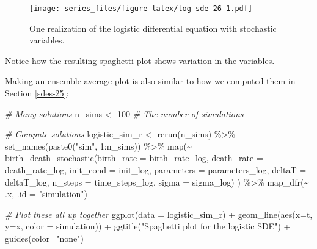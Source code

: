\documentclass[
]{book}
\newenvironment{Shaded}{\begin{snugshade}}{\end{snugshade}}
\newcommand{\AttributeTok}[1]{\textcolor[rgb]{0.77,0.63,0.00}{#1}}
\newcommand{\CommentTok}[1]{\textcolor[rgb]{0.56,0.35,0.01}{\textit{#1}}}
\newcommand{\DecValTok}[1]{\textcolor[rgb]{0.00,0.00,0.81}{#1}}
\newcommand{\FunctionTok}[1]{\textcolor[rgb]{0.00,0.00,0.00}{#1}}
\newcommand{\NormalTok}[1]{#1}
\newcommand{\OtherTok}[1]{\textcolor[rgb]{0.56,0.35,0.01}{#1}}
\newcommand{\SpecialCharTok}[1]{\textcolor[rgb]{0.00,0.00,0.00}{#1}}
\newcommand{\StringTok}[1]{\textcolor[rgb]{0.31,0.60,0.02}{#1}}
\theoremstyle{definition}
\theoremstyle{definition}
\theoremstyle{definition}
\theoremstyle{remark}
\begin{document}
\begin{figure}
\centering
\texttt{[image: series\_files/figure-latex/log-sde-26-1.pdf]}
\caption{\label{fig:log-sde-26}One realization of the logistic differential equation with stochastic variables.}
\end{figure}

Notice how the resulting spaghetti plot shows variation in the variables.

Making an ensemble average plot is also similar to how we computed them in Section \ref{sdes-25}:

\begin{Shaded}
\begin{Highlighting}[]
\CommentTok{\# Many solutions}
\NormalTok{n\_sims }\OtherTok{\textless{}{-}} \DecValTok{100}  \CommentTok{\# The number of simulations}

\CommentTok{\# Compute solutions}
\NormalTok{logistic\_sim\_r }\OtherTok{\textless{}{-}} \FunctionTok{rerun}\NormalTok{(n\_sims) }\SpecialCharTok{\%\textgreater{}\%}
  \FunctionTok{set\_names}\NormalTok{(}\FunctionTok{paste0}\NormalTok{(}\StringTok{"sim"}\NormalTok{, }\DecValTok{1}\SpecialCharTok{:}\NormalTok{n\_sims)) }\SpecialCharTok{\%\textgreater{}\%}
  \FunctionTok{map}\NormalTok{(}\SpecialCharTok{\textasciitilde{}} \FunctionTok{birth\_death\_stochastic}\NormalTok{(}\AttributeTok{birth\_rate =}\NormalTok{ birth\_rate\_log,}
                             \AttributeTok{death\_rate =}\NormalTok{ death\_rate\_log,}
                             \AttributeTok{init\_cond =}\NormalTok{ init\_log,}
                             \AttributeTok{parameters =}\NormalTok{ parameters\_log,}
                             \AttributeTok{deltaT =}\NormalTok{ deltaT\_log,}
                             \AttributeTok{n\_steps =}\NormalTok{ time\_steps\_log,}
                             \AttributeTok{sigma =}\NormalTok{ sigma\_log)}
\NormalTok{) }\SpecialCharTok{\%\textgreater{}\%}
  \FunctionTok{map\_dfr}\NormalTok{(}\SpecialCharTok{\textasciitilde{}}\NormalTok{ .x, }\AttributeTok{.id =} \StringTok{"simulation"}\NormalTok{)}


\CommentTok{\# Plot these all up together}
  \FunctionTok{ggplot}\NormalTok{(}\AttributeTok{data =}\NormalTok{ logistic\_sim\_r) }\SpecialCharTok{+}
  \FunctionTok{geom\_line}\NormalTok{(}\FunctionTok{aes}\NormalTok{(}\AttributeTok{x=}\NormalTok{t, }\AttributeTok{y=}\NormalTok{x, }\AttributeTok{color =}\NormalTok{ simulation)) }\SpecialCharTok{+}
  \FunctionTok{ggtitle}\NormalTok{(}\StringTok{"Spaghetti plot for the logistic SDE"}\NormalTok{) }\SpecialCharTok{+}
  \FunctionTok{guides}\NormalTok{(}\AttributeTok{color=}\StringTok{"none"}\NormalTok{)}
\end{Highlighting}
\end{Shaded}
\end{document}
